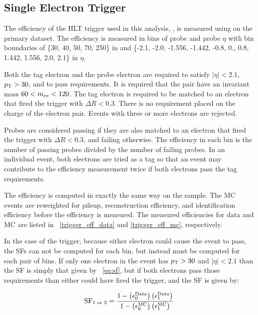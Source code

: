 
\subsection{Single Electron Trigger}

The efficiency of the HLT trigger used in this analysis,
\SingleElectronTrigger, is measured using \TnP on the primary dataset. The
efficiency is measured in bins of probe \pt and probe $\eta$ with bin
boundaries of \{30, 40, 50, 70, 250\} in \pt and \{-2.1, -2.0, -1.556, -1.442,
-0.8, 0., 0.8, 1.442, 1.556, 2.0, 2.1\} in $\eta$.

Both the tag electron and the probe electron are required to satisfy $|\eta| <
2.1$, $p_{\mathrm{T}} > 30$, and to pass \EGTIGHT requirements. It is required that the
pair have an invariant mass $60 < m_{ee} < 120$. The tag electron is required to
be matched to an electron that fired the trigger with $\Delta R < 0.3$. There
is no requirement placed on the charge of the electron pair. Events with three
or more electrons are rejected.

Probes are considered passing if they are also matched to an electron that
fired the trigger with $\Delta R < 0.3$, and failing otherwise. The efficiency
in each bin is the number of passing probes divided by the number of failing
probes. In an individual event, both electrons are tried as a tag so that an
event may contribute to the efficiency measurement twice if both electrons pass
the tag requirements.

The efficiency is computed in exactly the same way on the \MADGRAPH sample. The
MC events are reweighted for pileup, reconstruction efficiency, and
identification efficiency before the efficiency is measured. The measured
efficiencies for data and MC are listed in \TABS~\ref{trigger_eff_data} and
\ref{trigger_eff_mc}, respectively.

In the case of the trigger, because either electron could cause the event to
pass, the SFs can not be computed for each bin, but instead must be computed
for each pair of bins. If only one electron in the event has $p_{\mathrm{T}} > 30$ and
$|\eta| < 2.1$ than the SF is simply that given by \EQ~\ref{eq:sf}, but if both
electrons pass those requirements than either could have fired the trigger, and
the SF is given by:

\begin{equation}
    \label{eq:sf_double}
    \text{SF}_{1\text{ or }2} = \frac{1 - \left( \epsilon^{\text{Data}}_{0} \right) \left(
    \epsilon^{\text{Data}}_{1} \right)} {1 - \left( \epsilon^{\text{MC}}_{0} \right) \left( \epsilon^{\text{MC}}_{1}
    \right)}
\end{equation}


